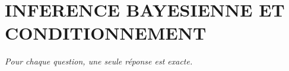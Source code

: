 
\section*{\textcolor{chapcolor}{\MakeUppercase{Inference bayesienne et conditionnement}}}

\begin{center}
\textit{Pour chaque question, une seule réponse est exacte.}
\end{center}

